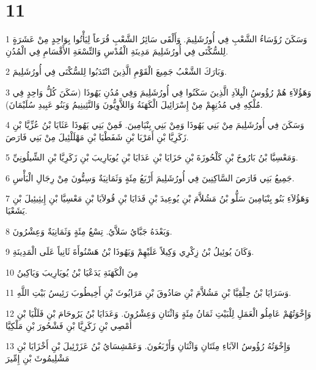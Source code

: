 \chapter{11}

\par 1 وَسَكَنَ رُؤَسَاءُ الشَّعْبِ فِي أُورُشَلِيمَ. وَأَلْقَى سَائِرُ الشَّعْبِ قُرَعاً لِيَأْتُوا بِوَاحِدٍ مِنْ عَشَرَةٍ لِلسُّكْنَى فِي أُورُشَلِيمَ مَدِينَةِ الْقُدْسِ وَالتِّسْعَةِ الأَقْسَامِ فِي الْمُدُنِ.
\par 2 وَبَارَكَ الشَّعْبُ جَمِيعَ الْقَوْمِ الَّذِينَ انْتَدَبُوا لِلسُّكْنَى فِي أُورُشَلِيمَ.
\par 3 وَهَؤُلاَءِ هُمْ رُؤُوسُ الْبِلاَدِ الَّذِينَ سَكَنُوا فِي أُورُشَلِيمَ وَفِي مُدُنِ يَهُوذَا (سَكَنَ كُلُّ وَاحِدٍ فِي مُلْكِهِ فِي مُدُنِهِمْ مِنْ إِسْرَائِيلَ الْكَهَنَةُ وَاللاَّوِيُّونَ وَالنَّثِينِيمُ وَبَنُو عَبِيدِ سُلَيْمَانَ).
\par 4 وَسَكَنَ فِي أُورُشَلِيمَ مِنْ بَنِي يَهُوذَا وَمِنْ بَنِي بِنْيَامِينَ. فَمِنْ بَنِي يَهُوذَا عَثَايَا بْنُ عُزِّيَّا بْنِ زَكَرِيَّا بْنِ أَمَرْيَا بْنِ شَفَطْيَا بْنِ مَهْلَلْئِيلَ مِنْ بَنِي فَارَصَ.
\par 5 وَمَعْسِيَّا بْنُ بَارُوخَ بْنِ كَلْحُوزَةَ بْنِ حَزَايَا بْنِ عَدَايَا بْنِ يُويَارِيبَ بْنِ زَكَرِيَّا بْنِ الشِّيلُونِيِّ.
\par 6 جَمِيعُ بَنِي فَارَصَ السَّاكِنِينَ فِي أُورُشَلِيمَ أَرْبَعُ مِئَةٍ وَثَمَانِيَةٌ وَسِتُّونَ مِنْ رِجَالِ الْبَأْسِ.
\par 7 وَهَؤُلاَءِ بَنُو بِنْيَامِينَ سَلُّو بْنُ مَشُلاَّمَ بْنِ يُوعِيدَ بْنِ فَدَايَا بْنِ قُولاَيَا بْنِ مَعْسِيَّا بْنِ إِيثِيئِيلَ بْنِ يَشَعْيَا.
\par 8 وَبَعْدَهُ جَبَّايُ سَلاَّيُ. تِسْعُ مِئَةٍ وَثَمَانِيَةٌ وَعِشْرُونَ.
\par 9 وَكَانَ يُوئِيلُ بْنُ زِكْرِي وَكِيلاً عَلَيْهِمْ وَيَهُوذَا بْنُ هَسْنُوأَةَ ثَانِياً عَلَى الْمَدِينَةِ.
\par 10 مِنَ الْكَهَنَةِ يَدَعْيَا بْنُ يُويَارِيبَ وَيَاكِينُ
\par 11 وَسَرَايَا بْنُ حِلْقِيَّا بْنِ مَشُلاَّمَ بْنِ صَادُوقَ بْنِ مَرَايُوثَ بْنِ أَخِيطُوبَ رَئِيسُ بَيْتِ اللَّهِ.
\par 12 وَإِخْوَتُهُمْ عَامِلُو الْعَمَلِ لِلْبَيْتِ ثَمَانُ مِئَةٍ وَاثْنَانِ وَعِشْرُونَ. وَعَدَايَا بْنُ يَرُوحَامَ بْنِ فَلَلْيَا بْنِ أَمْصِي بْنِ زَكَرِيَّا بْنِ فَشْحُورَ بْنِ مَلْكِيَّا
\par 13 وَإِخْوَتُهُ رُؤُوسُ الآبَاءِ مِئَتَانِ وَاثْنَانِ وَأَرْبَعُونَ. وَعَمْشِسَايُ بْنُ عَزَرْئِيلَ بْنِ أَخْزَايَا بْنِ مَشْلِيمُوثَ بْنِ إِمِّيرَ
